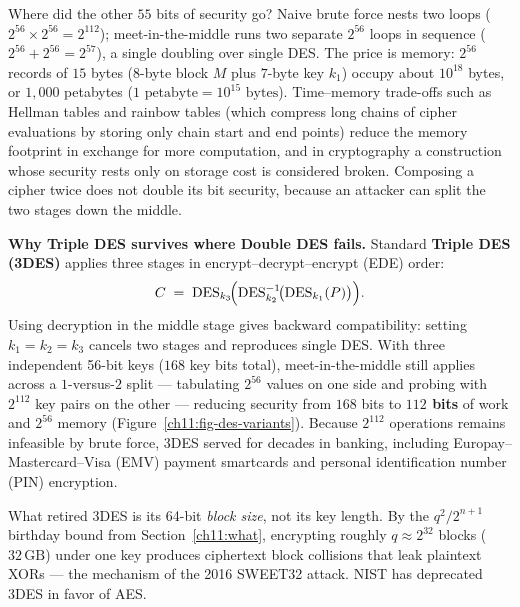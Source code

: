 \begin{walkbox}
Where did the other $55$ bits of security go? Naive brute force nests two loops ($2^{56} \times 2^{56} = 2^{112}$); meet-in-the-middle runs two separate $2^{56}$ loops in sequence ($2^{56} + 2^{56} = 2^{57}$), a single doubling over single DES. The price is memory: $2^{56}$ records of $15$ bytes ($8$-byte block $M$ plus $7$-byte key $k_1$) occupy about $10^{18}$ bytes, or $1{,}000$ petabytes ($1\text{ petabyte} = 10^{15}\text{ bytes}$). Time--memory trade-offs such as Hellman tables and rainbow tables (which compress long chains of cipher evaluations by storing only chain start and end points) reduce the memory footprint in exchange for more computation, and in cryptography a construction whose security rests only on storage cost is considered broken. Composing a cipher twice does not double its bit security, because an attacker can split the two stages down the middle.
\end{walkbox}

\begin{whybox}
\textbf{Why Triple DES survives where Double DES fails.} Standard \textbf{Triple DES (3DES)} applies three stages in encrypt--decrypt--encrypt (EDE) order:
\[
C \;=\; \mathrm{DES}_{k_3}\!\Bigl(\mathrm{DES}_{k_2}^{-1}\!\bigl(\mathrm{DES}_{k_1}(P)\bigr)\Bigr).
\]
Using decryption in the middle stage gives backward compatibility: setting $k_1 = k_2 = k_3$ cancels two stages and reproduces single DES. With three independent 56-bit keys ($168$ key bits total), meet-in-the-middle still applies across a $1$-versus-$2$ split --- tabulating $2^{56}$ values on one side and probing with $2^{112}$ key pairs on the other --- reducing security from $168$ bits to \textbf{$112$ bits} of work and $2^{56}$ memory (Figure~\ref{ch11:fig-des-variants}). Because $2^{112}$ operations remains infeasible by brute force, 3DES served for decades in banking, including Europay--Mastercard--Visa (EMV) payment smartcards and personal identification number (PIN) encryption.

What retired 3DES is its 64-bit \emph{block size}, not its key length. By the $q^2/2^{n+1}$ birthday bound from Section~\ref{ch11:what}, encrypting roughly $q \approx 2^{32}$ blocks ($32\,\text{GB}$) under one key produces ciphertext block collisions that leak plaintext XORs --- the mechanism of the 2016 SWEET32 attack. NIST has deprecated 3DES in favor of AES.
\end{whybox}

